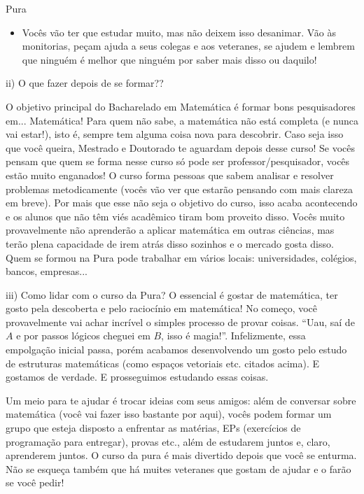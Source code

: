 \begin{subsecao}{Pura}
\begin{itemize}
ótimo momento para aprender a fazer demonstrações. Em 2017, juntaram as duas geometrias diferenciais em apenas uma
matéria e cálculo VI passou a ser obrigatória. Agora o curso tem os cálculos 1, 2, 3,
5 e 6 (Para onde foi cálculo 4? A demonstração fica a cargo do leitor).
O curso está sempre se atualizando para oferecer o melhor para os estudantes,
então se mobilizem para continuar melhorando a Pura (conversem com os RDs sobre isso!).
\item  Vocês vão ter que estudar muito, mas não deixem isso desanimar. Vão às monitorias,
peçam ajuda a seus colegas e aos veteranes, se ajudem e lembrem que ninguém é melhor 
que ninguém por saber mais disso ou daquilo!

\end{itemize}
ii) O que fazer depois de se formar??

O objetivo principal do Bacharelado em Matemática é formar bons pesquisadores
em... Matemática! Para quem não sabe, a matemática não está completa (e nunca
vai estar!), isto é, sempre tem alguma coisa nova para descobrir. Caso seja isso
que você queira, Mestrado e Doutorado te aguardam depois desse curso! Se vocês
pensam que quem se forma nesse curso só pode ser professor/pesquisador, vocês
estão muito enganados! O curso forma pessoas que sabem analisar e resolver problemas
metodicamente (vocês vão ver que estarão pensando com mais clareza em breve). Por
mais que esse não seja o objetivo do curso, isso acaba acontecendo e os alunos
que não têm viés acadêmico tiram bom proveito disso. Vocês muito provavelmente
não aprenderão a aplicar matemática em outras ciências, mas terão plena capacidade
de irem atrás disso sozinhos e o mercado gosta disso. Quem se formou na Pura pode
trabalhar em vários locais: universidades, colégios, bancos, empresas...

iii) Como lidar com o curso da Pura?
O essencial é gostar de matemática, ter gosto pela descoberta e pelo raciocínio
em matemática! No começo, você provavelmente vai achar incrível o simples processo
de provar coisas. ``Uau, saí de $A$ e por passos lógicos cheguei em $B$, isso é
magia!''. Infelizmente, essa empolgação inicial passa, porém acabamos desenvolvendo
um gosto pelo estudo de estruturas matemáticas (como espaços vetoriais etc.
citados acima). E gostamos de verdade. E prosseguimos estudando essas coisas.

Um meio para te ajudar é trocar ideias com seus amigos: além de conversar
sobre matemática (você vai fazer isso bastante por aqui), vocês podem formar um
grupo que esteja disposto a enfrentar as matérias, EPs (exercícios de
programação para entregar), provas etc., além de estudarem juntos e, claro,
aprenderem juntos. O curso da pura é mais divertido depois que você se enturma. Não se
esqueça também que há muites veteranes que gostam de ajudar e o farão se você pedir!


\end{subsecao}

